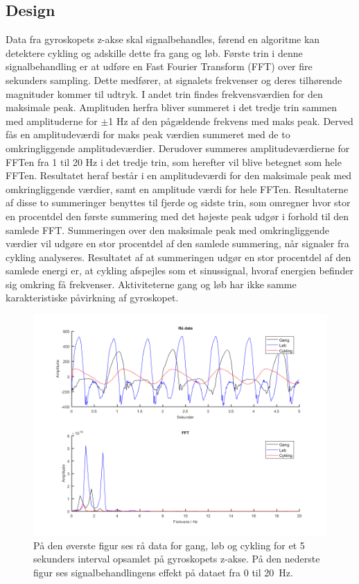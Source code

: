 \subsection{Design}\label{design_cykling}
Data fra gyroskopets z-akse skal signalbehandles, førend en algoritme kan detektere cykling og adskille dette fra gang og løb. Første trin i denne signalbehandling er at udføre en Fast Fourier Transform (FFT) over fire sekunders sampling. Dette medfører, at signalets frekvenser og deres tilhørende magnituder kommer til udtryk. I andet trin findes frekvensværdien for den maksimale peak. Amplituden herfra bliver summeret i det tredje trin sammen med amplituderne for $\pm$1 Hz af den pågældende frekvens med maks peak. Derved fås en amplitudeværdi for maks peak værdien summeret med de to omkringliggende amplitudeværdier. Derudover summeres amplitudeværdierne for FFTen fra 1 til 20 Hz i det tredje trin, som herefter vil blive betegnet som hele FFTen. Resultatet heraf består i en amplitudeværdi for den maksimale peak med omkringliggende værdier, samt en amplitude værdi for hele FFTen. Resultaterne af disse to summeringer benyttes til fjerde og sidste trin, som omregner hvor stor en procentdel den første summering med det højeste peak udgør i forhold til den samlede FFT. Summeringen over den maksimale peak med omkringliggende værdier vil udgøre en stor procentdel af den samlede summering, når signaler fra cykling analyseres. Resultatet af at summeringen udgør en stor procentdel af den samlede energi er, at cykling afspejles som et sinussignal, hvoraf energien befinder sig omkring få frekvenser. Aktiviteterne gang og løb har ikke samme karakteristiske påvirkning af gyroskopet.
\begin{figure}[H]
	\centering
	\includegraphics[scale=0.8]{figures/cDesign/gyro_behandling.png}
	\caption{På den øverste figur ses rå data for gang, løb og cykling for et 5 sekunders interval opsamlet på gyroskopets z-akse. På den nederste figur ses signalbehandlingens effekt på dataet fra 0 til 20~Hz.}
	\label{fig:gyro_behandling}
\end{figure}\vspace{-0.5cm}

